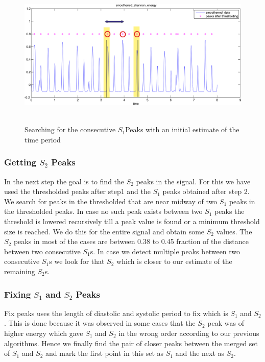 \documentclass{article}
\begin{document}
\begin{figure}
\begin{center}
\includegraphics[width=400pt, height=200pt]{detect_other.png}
\caption{Searching for the consecutive $S_1$Peaks with an initial estimate of the time period}
\end{center}
\end{figure}


 

\subsubsection{Getting $S_2$ Peaks}
In the next step the goal is to find the $S_2$ peaks in the signal. For this we have used the thresholded peaks after step1 and the $S_1$ peaks obtained after step 2. We search for peaks in the thresholded that are near midway of two $S_1$ peaks in the thresholded peaks. In case no such peak exists between two $S_1$ peaks the threshold is lowered recursively till a peak value is found or a minimum threshold size is reached. We do this for the entire signal and obtain some $S_2$ values. The $S_2$ peaks in most of the cases are between 0.38 to 0.45 fraction of the distance between two consecutive $S_1$s. In case we detect multiple peaks between two consecutive $S_1$s we look for that $S_2$ which is closer to our estimate of the remaining $S_2$s.

\subsubsection{Fixing $S_1$ and $S_2$ Peaks}
Fix peaks uses the length of diastolic and systolic period to fix which is $S_1$ and $S_2$. This is done because it was observed in some cases that the $S_2$ peak was of higher energy which gave $S_1$ and $S_2$ in the wrong order according to our previous algorithms. Hence we finally find the pair of closer peaks between the merged set of $S_1$ and $S_2$ and mark the first point in this set as $S_1$ and the next as $S_2$.\\
\end{document}
